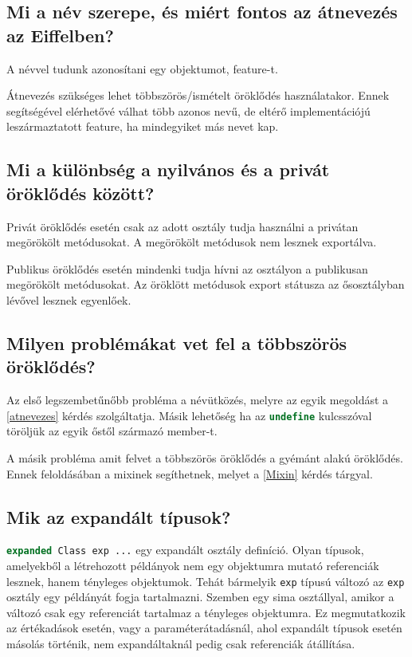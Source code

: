 \subsection{ Mi a név szerepe, és miért fontos az átnevezés az Eiffelben? }
	A névvel tudunk azonosítani egy objektumot, feature-t. 
	
	Átnevezés szükséges lehet többszörös/ismételt öröklődés használatakor. Ennek segítségével elérhetővé válhat több azonos nevű, de eltérő implementációjú leszármaztatott feature, ha mindegyiket más nevet kap.
	
\subsection{ Mi a különbség a nyilvános és a privát öröklődés között? }
	Privát öröklődés esetén csak az adott osztály tudja használni a privátan megörökölt metódusokat. A megörökölt metódusok nem lesznek exportálva.
	
	Publikus öröklődés esetén mindenki tudja hívni az osztályon a publikusan megörökölt metódusokat. Az öröklött metódusok export státusza az ősosztályban lévővel lesznek egyenlőek.
	
\subsection{ Milyen problémákat vet fel a többszörös öröklődés? }
	Az első legszembetűnőbb probléma a névütközés, melyre az egyik megoldást a \ref{atnevezes} kérdés szolgáltatja. Másik lehetőség ha az \lstinline[language=Eiffel]|undefine| kulcsszóval töröljük az egyik őstől származó member-t.
	
	A másik probléma amit felvet a többszörös öröklődés a gyémánt alakú öröklődés. Ennek feloldásában a mixinek segíthetnek, melyet a \ref{Mixin} kérdés tárgyal. 
	
\subsection{ Mik az expandált típusok? }
	\lstinline[language=Eiffel]|expanded Class exp ...| egy expandált osztály definíció. Olyan típusok, amelyekből a létrehozott példányok nem egy objektumra mutató referenciák lesznek, hanem tényleges objektumok. Tehát bármelyik \lstinline[language=Eiffel]|exp| típusú változó az \lstinline[language=Eiffel]|exp| osztály egy példányát fogja tartalmazni. Szemben egy sima osztállyal, amikor a változó csak egy referenciát tartalmaz a tényleges objektumra. Ez megmutatkozik az értékadások esetén, vagy a paraméterátadásnál, ahol expandált típusok esetén másolás történik, nem expandáltaknál pedig csak referenciák átállítása.
	
